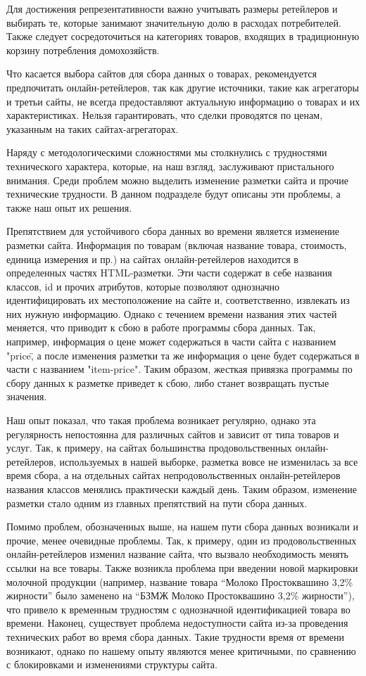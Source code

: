 Для достижения репрезентативности важно учитывать размеры ретейлеров и выбирать те, которые занимают значительную долю в расходах потребителей. Также следует сосредоточиться на категориях товаров, входящих в традиционную корзину потребления домохозяйств.

Что касается выбора сайтов для сбора данных о товарах, рекомендуется предпочитать онлайн-ретейлеров, так как другие источники, такие как агрегаторы и третьи сайты, не всегда предоставляют актуальную информацию о товарах и их характеристиках. Нельзя гарантировать, что сделки проводятся по ценам, указанным на таких сайтах-агрегаторах.


Наряду с методологическими сложностями мы столкнулись с трудностями технического характера, которые, на наш взгляд, заслуживают пристального внимания. Среди проблем можно выделить изменение разметки сайта и прочие технические трудности. В данном подразделе будут описаны эти проблемы, а также наш опыт их решения.

Препятствием для устойчивого сбора данных во времени является изменение разметки сайта. Информация по товарам (включая название товара, стоимость, единица измерения и пр.) на сайтах онлайн-ретейлеров находится в определенных частях HTML-разметки. Эти части содержат в себе названия классов, id и прочих атрибутов, которые позволяют однозначно идентифицировать их местоположение на сайте и, соответственно, извлекать из них нужную информацию. Однако с течением времени названия этих частей меняется, что приводит к сбою в работе программы сбора данных. Так, например, информация о цене может содержаться в части сайта с названием "price\", а после изменения разметки та же информация о цене будет содержаться в части с названием "item-price". Таким образом, жесткая привязка программы по сбору данных к разметке приведет к сбою, либо станет возвращать пустые значения.

Наш опыт показал, что такая проблема возникает регулярно, однако эта регулярность непостоянна для различных сайтов и зависит от типа товаров и услуг. Так, к примеру, на сайтах большинства продовольственных онлайн-ретейлеров, используемых в нашей выборке, разметка вовсе не изменилась за все время сбора, а на отдельных сайтах непродовольственных онлайн-ретейлеров названия классов менялись практически каждый день. Таким образом, изменение разметки стало одним из главных препятствий на пути сбора данных.


Помимо проблем, обозначенных выше, на нашем пути сбора данных возникали и прочие, менее очевидные проблемы. Так, к примеру, один из продовольственных онлайн-ретейлеров изменил название сайта, что вызвало необходимость менять ссылки на все товары. Также возникла проблема при введении новой маркировки молочной продукции (например, название товара \enquote{Молоко Простоквашино 3,2\% жирности} было заменено на \enquote{БЗМЖ Молоко Простоквашино 3,2\% жирности}), что привело к временным трудностям с однозначной идентификацией товара во времени. Наконец, существует проблема недоступности сайта из-за проведения технических работ во время сбора данных. Такие трудности время от времени возникают, однако по нашему опыту являются менее критичными, по сравнению с блокировками и изменениями структуры сайта.

